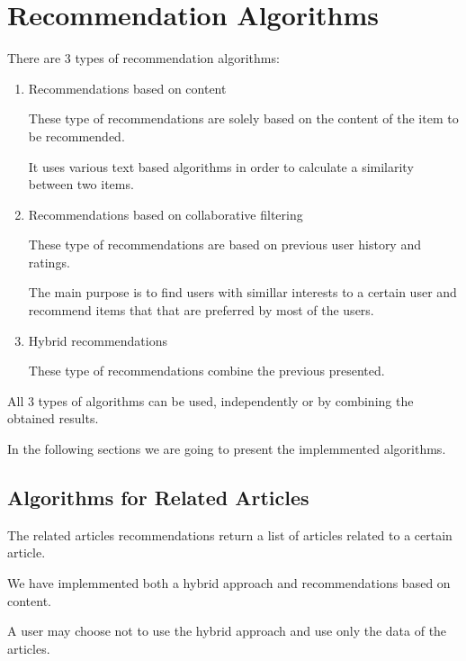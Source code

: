 \chapter{Recommendation Algorithms}
\label{chapter:recommendation-system-algorithms}
There are 3 types of recommendation algorithms: 
\begin{enumerate}
	\item Recommendations based on content
		 
		These type of recommendations are solely based on the content of the item to be recommended.
		
		It uses various text based algorithms in order to calculate a similarity between two items.

	\item Recommendations based on collaborative filtering 
		
		These type of recommendations are based on previous user history and ratings.
		 
		The main purpose is to find users with simillar interests to a certain user and recommend items that that are preferred by most of the users.
	
	\item Hybrid recommendations

		These type of recommendations combine the previous presented.

\end{enumerate}
All 3 types of algorithms can be used, independently or by combining the obtained results.

In the following sections we are going to present the implemmented algorithms.


\section{Algorithms for Related Articles}
\label{sec:algorithms-for-related-articles}
The related articles recommendations return a list of articles related to a certain article.

We have implemmented both a hybrid approach and recommendations based on content.

A user may choose not to use the hybrid approach and use only the data of the articles.

